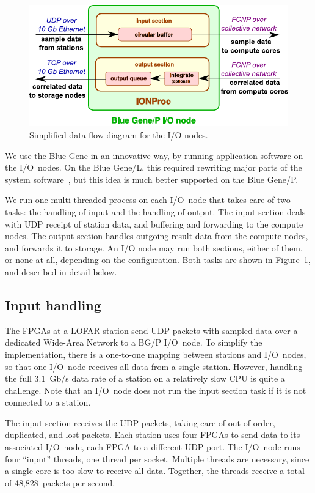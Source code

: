 \documentclass{sig-alternate}
\begin{document}
\begin{figure}[ht]
\includegraphics[width=\columnwidth]{ION-processing.pdf}
\caption{Simplified data flow diagram for the I/O nodes.}
\label{fig:ion-processing}
\end{figure}

We use the Blue Gene in an innovative way, by running application software
on the I/O~nodes.
On the Blue Gene/L, this required rewriting major parts of the system
software~\cite{Iskra:08}, but this idea is much better supported on the
Blue Gene/P.

We run one multi-threaded process on each I/O~node that takes care of two
tasks: the handling of input and the handling of output.
The input section deals with UDP receipt of station data, and buffering and forwarding to the compute nodes.
The output section handles outgoing result data from the compute nodes, and forwards it to storage.
An I/O node may run both sections, either of them, or none at all, depending
on the configuration.
Both tasks are shown in Figure~\ref{fig:ion-processing}, and described in detail below.


\subsection{Input handling}
\label{sec:input-handling}

The FPGAs at a LOFAR station send UDP packets with sampled data over a
dedicated Wide-Area Network to a BG/P I/O~node.
To simplify the implementation, there is a one-to-one mapping between
stations and I/O~nodes, so that one I/O~node receives all data from a single
station.
However, handling the full 3.1~Gb/s data rate of a station on a relatively
slow CPU is quite a challenge.
Note that an I/O~node does not run the input section task if it is not
connected to a station.

The input section receives the UDP packets, taking care of out-of-order,
duplicated, and lost packets.
Each station uses four FPGAs to send data to its associated I/O~node,
each FPGA to a different UDP port.
The I/O~node runs four ``input'' threads, one thread per socket.
Multiple threads are necessary, since a single core is too slow to receive all
data.
Together, the threads receive a total of 48,828~packets per second.
\end{document}
